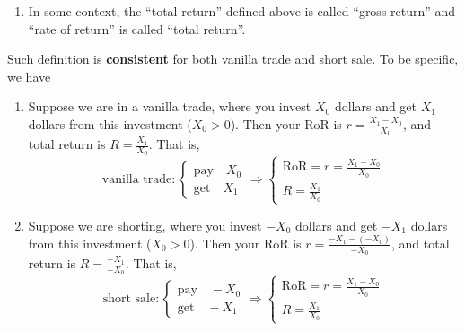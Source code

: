 \documentclass[13pt]{article}
\theoremstyle{definition}
\theoremstyle{remark}
\newenvironment{remark}
  {\pushQED{\qed}\renewcommand{\qedsymbol}{$\triangle$}\remarkx}
  {\popQED\endremarkx}
\begin{document}
\begin{remark}\hfill
\begin{enumerate}[label=(\alph*)]
    \item In some context, the ``total return'' defined above is called ``gross return'' and ``rate of return'' is called ``total return''.
\end{enumerate}
    Such definition is \textbf{consistent} for both vanilla trade and short sale. To be specific, we have
    \begin{enumerate}
        \item Suppose we are in a vanilla trade, where you invest $X_0$ dollars and get $X_1$ dollars from this investment ($X_0>0$). Then your RoR is $r=\frac{X_1-X_0}{X_0}$, and total return is $R=\frac{X_1}{X_0}$. That is,
\[
\text{vanilla trade}: \begin{cases}
\text{pay} \quad X_0 \\
\text{get} \quad X_1
\end{cases}
\Longrightarrow
\begin{cases}
\text{RoR}=r= \frac{X_1-X_0}{X_0}\\
R=\frac{X_1}{X_0}
\end{cases}
\]
\item Suppose we are shorting, where you invest $-X_0$ dollars and get $-X_1$ dollars from this investment  ($X_0>0$). Then your RoR is $r=\frac{-X_1-(-X_0)}{-X_0}$, and total return is $R=\frac{-X_1}{-X_0}$. That is,
\[
\text{short sale}: \begin{cases}
\text{pay} \quad -X_0 \\
\text{get} \quad -X_1
\end{cases}
\Longrightarrow
\begin{cases}
\text{RoR}=r= \frac{X_1-X_0}{X_0}\\
R=\frac{X_1}{X_0}
\end{cases}
\]
    \end{enumerate}
\end{remark}
\end{document}
